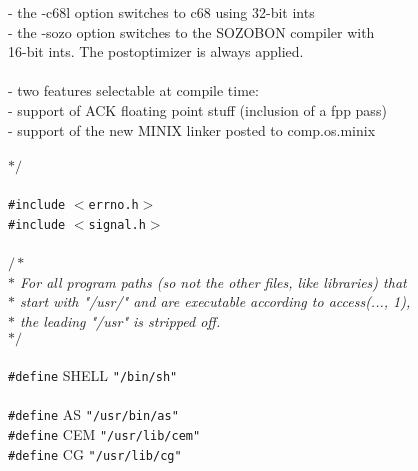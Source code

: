 \begin{flushleft}
{\hspace*{7\indentation}- the -c68l option switches to c68 using 32-bit ints\mbox{}\\
\hspace*{7\indentation}- the -sozo option switches to the SOZOBON compiler with\mbox{}\\
\hspace*{14\indentation}16-bit ints. The postoptimizer is always applied.\mbox{}\\
\mbox{}\\
\hspace*{8\indentation}- two features selectable at compile time:\mbox{}\\
\hspace*{12\indentation}- support of ACK floating point stuff (inclusion of a fpp pass)\mbox{}\\
\hspace*{12\indentation}- support of the new MINIX linker posted to comp.os.minix\mbox{}\\
\mbox{}\\
$\ast/$}\mbox{}\\
\hspace*{3\indentation}\mbox{}\\
{\tt \#include} $<${\tt{}errno.h}$>$\mbox{}\\
{\tt \#include} $<${\tt{}signal.h}$>$\mbox{}\\
\mbox{}\\
{$/\ast$\it{}\mbox{}\\
\hspace*{1\indentation}$\ast$ For all program paths (so not the other files, like libraries) that\mbox{}\\
\hspace*{1\indentation}$\ast$ start with "/usr/" and are executable according to access(..., 1),\mbox{}\\
\hspace*{1\indentation}$\ast$ the leading "/usr" is stripped off.\mbox{}\\
\hspace*{1\indentation}$\ast/$}\mbox{}\\
\mbox{}\\
{\tt \#define} SHELL     {\tt"/bin/sh"}\mbox{}\\
\mbox{}\\
{\tt \#define} AS     {\tt"/usr/bin/as"}\mbox{}\\
{\tt \#define} CEM    {\tt"/usr/lib/cem"}\mbox{}\\
{\tt \#define} CG     {\tt"/usr/lib/cg"}\mbox{}\\

\end{flushleft}
